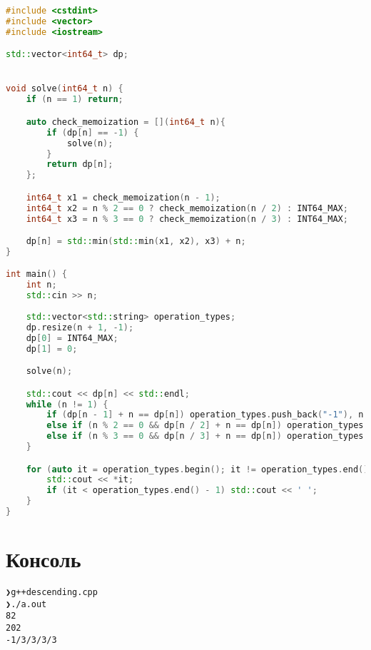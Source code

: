 \begin{lstlisting}[language=C++]
#include <cstdint>
#include <vector>
#include <iostream>

std::vector<int64_t> dp;


void solve(int64_t n) {
    if (n == 1) return;

    auto check_memoization = [](int64_t n){
        if (dp[n] == -1) {
            solve(n);
        }
        return dp[n];
    };

    int64_t x1 = check_memoization(n - 1);
    int64_t x2 = n % 2 == 0 ? check_memoization(n / 2) : INT64_MAX;
    int64_t x3 = n % 3 == 0 ? check_memoization(n / 3) : INT64_MAX;

    dp[n] = std::min(std::min(x1, x2), x3) + n;
}

int main() {
    int n;
    std::cin >> n;
    
    std::vector<std::string> operation_types;
    dp.resize(n + 1, -1);
    dp[0] = INT64_MAX;
    dp[1] = 0;

    solve(n);

    std::cout << dp[n] << std::endl;
    while (n != 1) {
        if (dp[n - 1] + n == dp[n]) operation_types.push_back("-1"), n -= 1;
        else if (n % 2 == 0 && dp[n / 2] + n == dp[n]) operation_types.push_back("/2"), n /= 2;
        else if (n % 3 == 0 && dp[n / 3] + n == dp[n]) operation_types.push_back("/3"), n /= 3;
    }

    for (auto it = operation_types.begin(); it != operation_types.end(); ++it) {
        std::cout << *it;
        if (it < operation_types.end() - 1) std::cout << ' ';
    }
}
\end{lstlisting}

\pagebreak

\section{Консоль}
\begin{alltt}
❯ g++ descending.cpp
❯ ./a.out
82
202
-1 /3 /3 /3 /3%  
\end{alltt}
\pagebreak

